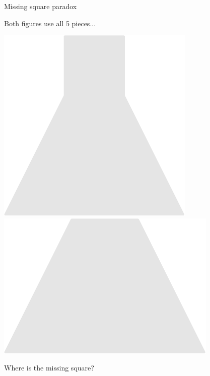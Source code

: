 \documentclass[14pt]{beamer}
\begin{document}

    \begin{frame}{Missing square paradox}
        \begin{center}
            Both figures use all 5 pieces...

            \vspace{8pt}

            \;\;\includegraphics[scale=0.5]{figures/figure022u.pdf}\qquad
            \qquad
            \includegraphics[scale=0.5]{figures/figure022i.pdf}\;

            \vspace{32pt}

            Where is the missing square?
        \end{center}
    \end{frame}
\end{document}
